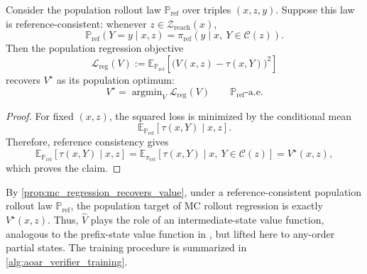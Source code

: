 \documentclass{article}
\numberwithin{theorem}{section}
\numberwithin{proposition}{section}
\numberwithin{corollary}{section}
\numberwithin{lemma}{section}
\numberwithin{conjecture}{section}
\numberwithin{remark}{section}
\numberwithin{definition}{section}
\numberwithin{assumption}{section}
\numberwithin{example}{section}
\newcommand{\calC}{{\mathcal{C}}}
\newcommand{\calL}{{\mathcal{L}}}
\newcommand{\calZ}{{\mathcal{Z}}}
\newcommand{\bbE}{\mathbb{E}}
\newcommand{\bbP}{\mathbb{P}}
\providecommand{\base}{\pi_{\mathrm{ref}}}
\DeclareMathOperator*{\argmin}{argmin}
\begin{document}
\begin{proposition}
\label{prop:mc_regression_recovers_value}
Consider the population rollout law $\bbP_{\mathrm{ref}}$ over triples $(x,z,y)$. Suppose this law is reference-consistent: whenever $z\in\calZ_{\mathrm{reach}}(x)$,
\begin{equation*}
    \bbP_{\mathrm{ref}}(Y=y\mid x,z)
    =
    \base(y\mid x,\ Y\in\calC(z)).
\end{equation*}
Then the population regression objective
\begin{equation*}
    \calL_{\mathrm{reg}}(V)
    :=
    \bbE_{\bbP_{\mathrm{ref}}}
    \left[
        \bigl(V(x,z)-\tau(x,Y)\bigr)^2
    \right]
\end{equation*}
recovers \(V^\star\) as its population optimum:
\begin{equation*}
    V^\star = \argmin_V \calL_{\mathrm{reg}}(V)
    \qquad
    \bbP_{\mathrm{ref}}\text{-a.e.}
\end{equation*}
\end{proposition}

\begin{proof}
For fixed $(x,z)$, the squared loss is minimized by the conditional mean
\begin{equation*}
    \bbE_{\bbP_{\mathrm{ref}}}\left[\tau(x,Y)\mid x,z\right].
\end{equation*}
Therefore, reference consistency gives
\begin{equation*}
    \bbE_{\bbP_{\mathrm{ref}}}\left[\tau(x,Y)\mid x,z\right]
    =
    \bbE_{\base}
    \left[
        \tau(x,Y)\mid x,\ Y\in\calC(z)
    \right]
    =
    V^\star(x,z),
\end{equation*}
which proves the claim.
\end{proof}

By \cref{prop:mc_regression_recovers_value}, under a reference-consistent population rollout law $\bbP_{\mathrm{ref}}$, the population target of MC rollout regression is exactly $V^\star(x,z)$. Thus, $\widehat V$ plays the role of an intermediate-state value function, analogous to the prefix-state value function in \citet{rohatgi2025taming}, but lifted here to any-order partial states. The training procedure is summarized in \cref{alg:aoar_verifier_training}.
\end{document}
